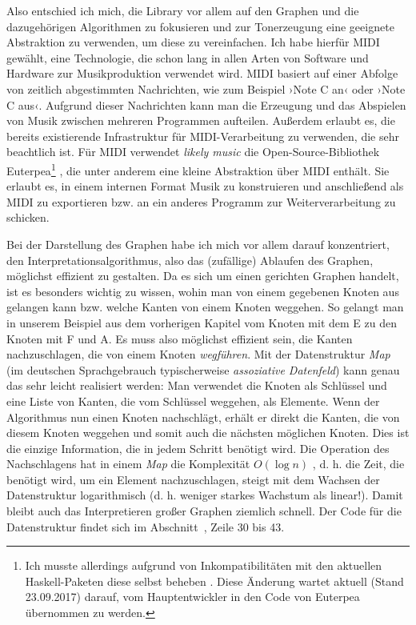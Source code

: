 \documentclass[a4paper,twocolumn]{article}
\begin{document}
Also entschied ich mich, die Library vor allem auf den Graphen und die
dazugehörigen Algorithmen zu fokusieren und zur Tonerzeugung eine geeignete
Abstraktion zu verwenden, um diese zu vereinfachen. Ich habe hierfür MIDI
gewählt, eine Technologie, die schon lang in allen Arten von Software und
Hardware zur Musikproduktion verwendet wird. MIDI basiert auf einer
Abfolge von zeitlich abgestimmten Nachrichten, wie zum Beispiel ›Note C an‹ oder
›Note C aus‹. Aufgrund dieser Nachrichten kann man die Erzeugung und das
Abspielen von Musik zwischen mehreren Programmen aufteilen. Außerdem erlaubt es,
die bereits existierende Infrastruktur für MIDI-Verarbeitung zu verwenden, die
sehr beachtlich ist. Für MIDI verwendet {\it likely music} die
Open-Source-Bibliothek Euterpea\footnote{Ich musste allerdings aufgrund von
Inkompatibilitäten mit den aktuellen Haskell-Paketen diese selbst beheben
\cite{euterpea_fork}. Diese Änderung wartet \cite{euterpea_issue} aktuell (Stand
23.09.2017) darauf, vom Hauptentwickler
in den Code von Euterpea übernommen zu werden.}
\cite{euterpea}, die unter anderem eine kleine Abstraktion über MIDI enthält.
Sie erlaubt es, in einem internen Format Musik zu
konstruieren und anschließend als MIDI zu exportieren bzw. an ein anderes
Programm zur Weiterverarbeitung zu schicken.

Bei der Darstellung des Graphen habe ich mich vor allem darauf konzentriert,
den Interpretationsalgorithmus, also das (zufällige) Ablaufen des Graphen,
möglichst effizient zu gestalten. Da es sich um einen gerichten Graphen handelt,
ist es besonders wichtig zu wissen, wohin man von einem gegebenen Knoten aus
gelangen kann bzw. welche Kanten von einem Knoten weggehen. So gelangt man in unserem Beispiel
aus dem vorherigen Kapitel vom Knoten mit dem E zu den Knoten mit F und
A. Es muss also möglichst effizient sein, die Kanten nachzuschlagen, die von
einem Knoten {\it wegführen}. Mit der Datenstruktur {\it Map} \cite{map} (im
deutschen Sprachgebrauch typischerweise {\it assoziative Datenfeld}) kann
genau das sehr leicht realisiert werden: Man verwendet die Knoten als Schlüssel und
eine Liste von Kanten, die vom Schlüssel weggehen, als Elemente. Wenn
der Algorithmus nun einen Knoten nachschlägt, erhält er direkt die Kanten, die
von diesem Knoten weggehen und somit auch die nächsten möglichen Knoten. Dies
ist die einzige Information, die in jedem Schritt benötigt wird. Die Operation
des Nachschlagens hat in einem {\it Map} die Komplexität $O(\log n)$
\cite{map_lookup}, d. h. die Zeit, die benötigt wird, um ein Element
nachzuschlagen, steigt mit dem Wachsen der Datenstruktur logarithmisch
(d. h. weniger starkes Wachstum als linear!). Damit bleibt auch das Interpretieren
großer Graphen ziemlich schnell. Der Code für die Datenstruktur findet
sich im Abschnitt~, Zeile 30 bis 43.
\end{document}
